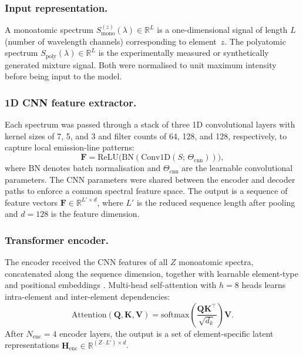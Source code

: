 \documentclass{iopjournal}
\begin{document}
\subsubsection{Input representation.}

A monoatomic spectrum $S_{\mathrm{mono}}^{(z)}(\lambda) \in \mathbb{R}^{L}$ is a one-dimensional signal of length $L$ (number of wavelength channels) corresponding to element~$z$.
The polyatomic spectrum $S_{\mathrm{poly}}(\lambda) \in \mathbb{R}^{L}$ is the experimentally measured or synthetically generated mixture signal.
Both were normalised to unit maximum intensity before being input to the model.

\subsubsection{1D CNN feature extractor.}

Each spectrum was passed through a stack of three 1D convolutional layers \cite{he_deep_2016} with kernel sizes of 7, 5, and 3 and filter counts of 64, 128, and 128, respectively, to capture local emission-line patterns:
\begin{equation}
\mathbf{F} = \mathrm{ReLU}\!\bigl(\mathrm{BN}(\mathrm{Conv1D}(S;\,\Theta_{\mathrm{cnn}}))\bigr),
\end{equation}
where $\mathrm{BN}$ denotes batch normalisation \cite{ioffe_batch_2015} and $\Theta_{\mathrm{cnn}}$ are the learnable convolutional parameters.
The CNN parameters were shared between the encoder and decoder paths to enforce a common spectral feature space.
The output is a sequence of feature vectors $\mathbf{F} \in \mathbb{R}^{L' \times d}$, where $L'$ is the reduced sequence length after pooling and $d = 128$ is the feature dimension.

\subsubsection{Transformer encoder.}

The encoder received the CNN features of all $Z$ monoatomic spectra, concatenated along the sequence dimension, together with learnable element-type and positional embeddings \cite{vaswani_attention_2017}.
Multi-head self-attention with $h = 8$ heads learns intra-element and inter-element dependencies:
\begin{equation}
\mathrm{Attention}(\mathbf{Q},\mathbf{K},\mathbf{V}) = \mathrm{softmax}\!\left(\frac{\mathbf{Q}\mathbf{K}^\top}{\sqrt{d_k}}\right)\mathbf{V}.
\end{equation}
After $N_{\mathrm{enc}} = 4$ encoder layers, the output is a set of element-specific latent representations $\mathbf{H}_{\mathrm{enc}} \in \mathbb{R}^{(Z \cdot L') \times d}$.
\end{document}
